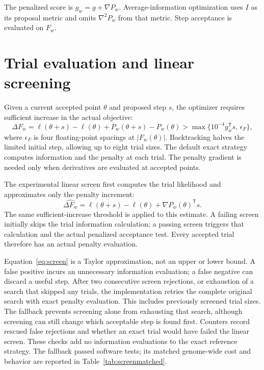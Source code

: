 \documentclass[11pt]{article}
\begin{document}
The penalized score is $g_w=g+\nabla P_w$. Average-information optimization uses $I$ as its proposal metric and omits $\nabla^2P_w$ from that metric. Step acceptance is evaluated on $F_w$.

\section{Trial evaluation and linear screening}
Given a current accepted point $\theta$ and proposed step $s$, the optimizer requires sufficient increase in the actual objective:
\begin{equation}
 \Delta F_w=\ell(\theta+s)-\ell(\theta)+P_w(\theta+s)-P_w(\theta)
 >\max\{10^{-4}g_w^\mathsf{T}s,\,\epsilon_F\},
\end{equation}
where $\epsilon_F$ is four floating-point spacings at $|F_w(\theta)|$. Backtracking halves the limited initial step, allowing up to eight trial sizes. The default exact strategy computes information and the penalty at each trial. The penalty gradient is needed only when derivatives are evaluated at accepted points.

The experimental linear screen first computes the trial likelihood and approximates only the penalty increment:
\begin{equation}
 \widehat{\Delta F_w}=
 \ell(\theta+s)-\ell(\theta)+\nabla P_w(\theta)^\mathsf{T}s.
 \label{eq:screen}
\end{equation}
The same sufficient-increase threshold is applied to this estimate. A failing screen initially skips the trial information calculation; a passing screen triggers that calculation and the actual penalized acceptance test. Every accepted trial therefore has an actual penalty evaluation.

Equation~\eqref{eq:screen} is a Taylor approximation, not an upper or lower bound. A false positive incurs an unnecessary information evaluation; a false negative can discard a useful step. After two consecutive screen rejections, or exhaustion of a search that skipped any trials, the implementation retries the complete original search with exact penalty evaluation. This includes previously screened trial sizes. The fallback prevents screening alone from exhausting that search, although screening can still change which acceptable step is found first. Counters record rescued false rejections and whether an exact trial would have failed the linear screen. These checks add no information evaluations to the exact reference strategy. The fallback passed software tests; its matched genome-wide cost and behavior are reported in Table~\ref{tab:screenmatched}.
\end{document}
